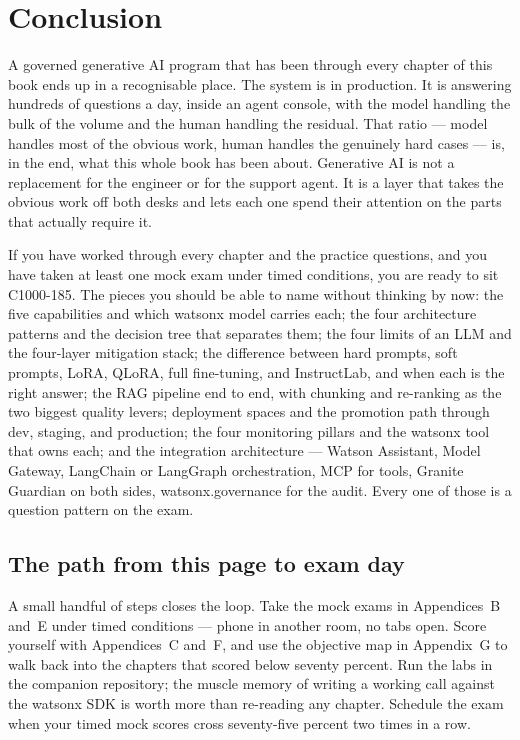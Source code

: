 \chapter*{Conclusion}

A governed generative AI program that has been through every chapter of this book ends up in a recognisable place. The system is in production. It is answering hundreds of questions a day, inside an agent console, with the model handling the bulk of the volume and the human handling the residual. That ratio --- model handles most of the obvious work, human handles the genuinely hard cases --- is, in the end, what this whole book has been about. Generative AI is not a replacement for the engineer or for the support agent. It is a layer that takes the obvious work off both desks and lets each one spend their attention on the parts that actually require it.

If you have worked through every chapter and the practice questions, and you have taken at least one mock exam under timed conditions, you are ready to sit C1000-185. The pieces you should be able to name without thinking by now: the five capabilities and which watsonx model carries each; the four architecture patterns and the decision tree that separates them; the four limits of an LLM and the four-layer mitigation stack; the difference between hard prompts, soft prompts, LoRA, QLoRA, full fine-tuning, and InstructLab, and when each is the right answer; the RAG pipeline end to end, with chunking and re-ranking as the two biggest quality levers; deployment spaces and the promotion path through dev, staging, and production; the four monitoring pillars and the watsonx tool that owns each; and the integration architecture --- Watson Assistant, Model Gateway, LangChain or LangGraph orchestration, MCP for tools, Granite Guardian on both sides, watsonx.governance for the audit. Every one of those is a question pattern on the exam.

\section*{The path from this page to exam day}

A small handful of steps closes the loop. Take the mock exams in Appendices~B and~E under timed conditions --- phone in another room, no tabs open. Score yourself with Appendices~C and~F, and use the objective map in Appendix~G to walk back into the chapters that scored below seventy percent. Run the labs in the companion repository; the muscle memory of writing a working call against the watsonx SDK is worth more than re-reading any chapter. Schedule the exam when your timed mock scores cross seventy-five percent two times in a row.

